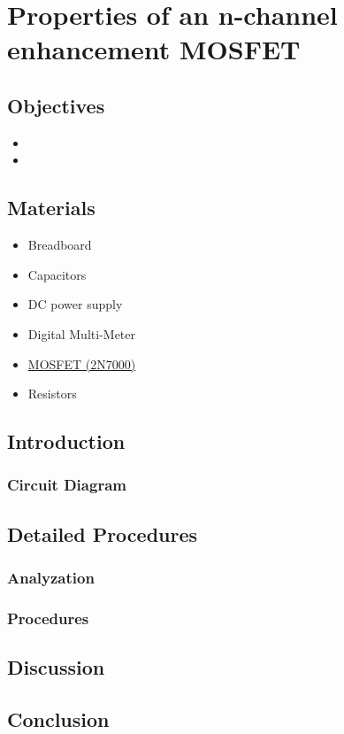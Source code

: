 \chapter{Properties of an n-channel enhancement MOSFET}


\section{Objectives}
\begin{itemize}
    \item 
    \item 
\end{itemize}

\section{Materials}
\begin{itemize}
    \item Breadboard
    \item Capacitors
    \item DC power supply
    \item Digital Multi-Meter
    \item \hyperref[2N7000_1]{MOSFET (2N7000)}
    \item Resistors
\end{itemize}

\section{Introduction}
    \subsection{Circuit Diagram}


\section{Detailed Procedures}
    \subsection{Analyzation}


    \subsection{Procedures}

    
\section{Discussion}


\section{Conclusion}

